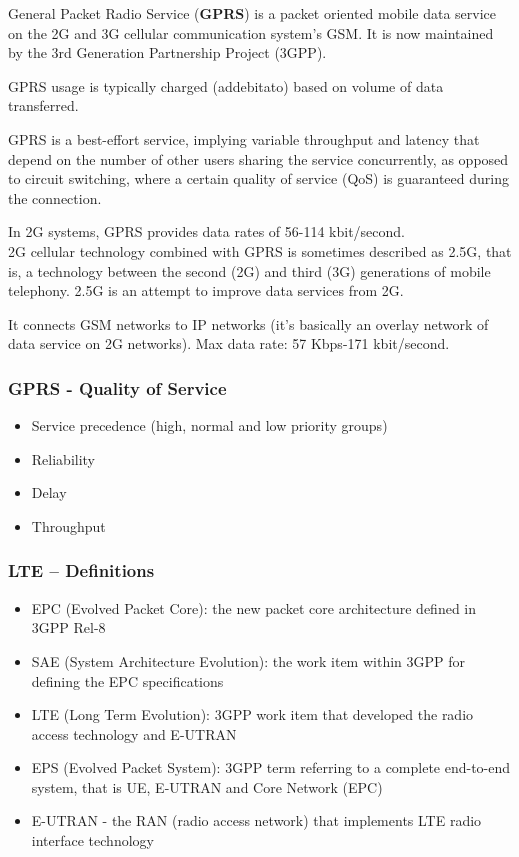 General Packet Radio Service (\textbf{GPRS}) is a packet oriented mobile data
service on the 2G and 3G cellular communication system's GSM. It is now
maintained by the 3rd Generation Partnership Project (3GPP).

GPRS usage is typically charged (addebitato) based on volume of data
transferred.

GPRS is a best-effort service, implying variable throughput and latency that
depend on the number of other users sharing the service concurrently, as
opposed to circuit switching, where a certain quality of service (QoS) is
guaranteed during the connection.

In 2G systems, GPRS provides data rates of 56-114 kbit/second. \\

2G cellular technology combined with GPRS is sometimes described as 2.5G,
that is, a technology between the second (2G) and third (3G) generations of
mobile telephony. 2.5G is an attempt to improve data services from
2G.

It connects GSM networks to IP networks (it's basically an overlay network of
data service on 2G networks). Max data rate: 57 Kbps-171 kbit/second.

\subsubsection{GPRS - Quality of Service}
\begin{itemize}
  \item Service precedence (high, normal and low priority groups)
  \item Reliability
  \item Delay
  \item Throughput
\end{itemize}

\subsubsection{LTE – Definitions}

\begin{itemize}
  \item EPC (Evolved Packet Core): the new packet core architecture defined in
3GPP Rel-8
  \item SAE (System Architecture Evolution): the work item within 3GPP for
defining the EPC specifications
  \item LTE (Long Term Evolution): 3GPP work item that developed the radio
access technology and E-UTRAN
  \item EPS (Evolved Packet System): 3GPP term referring to a complete
end-to-end system, that is UE, E-UTRAN and Core Network (EPC)
  \item E-UTRAN - the RAN (radio access network) that implements LTE radio
interface technology
\end{itemize}

